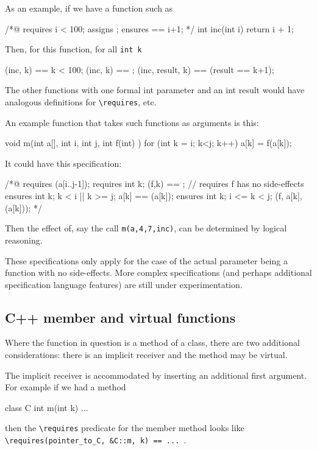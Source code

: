 As an example, if we have a function such as 
\begin{listing-nonumber}
/*@ requires i < 100;
       assigns \empty;
       ensures \result == i+1;
       */
int inc(int i) { return i + 1; }
\end{listing-nonumber}
Then, for this function, for all \lstinline|int k|
\begin{listing-nonumber}
\requires(inc, k) == k < 100;
\assigns(inc, k) == \empty;
\ensures(inc, result, k) == (result == k+1);
\end{listing-nonumber}
The other functions with one formal int parameter and an int result would have analogous definitions for \lstinline|\requires|, etc.

An example function that takes such functions as arguments is this:
\begin{listing-nonumber}
void m(int a[], int i, int j, int f(int) ) {
  for (int k = i; k<j; k++) a[k] = f(a[k]);
}
\end{listing-nonumber}

It could have this specification:
\begin{listing-nonumber}
/*@
  requires \valid(a[i..j-1]);
  requires \forall int k; \assigns(f,k) == \empty;  // requires f has no side-effects
  ensures \forall int k; k < i || k >= j; a[k] == \old(a[k]);
  ensures \forall int k; i <= k < j; \ensures(f, a[k], \old(a[k]));
*/
\end{listing-nonumber}
Then the effect of, say the call \lstinline|m(a,4,7,inc)|, can be determined by logical reasoning.

These specifications only apply for the case of the actual parameter being a function with no side-effects. More complex specifications (and perhaps additional specification language features) are still under experimentation.

\subsection{C++ member and virtual functions}

Where the function in question is a method of a class, there are two additional considerations: there is an implicit receiver and the method may be virtual.

The implicit receiver is accommodated by inserting an additional first argument. For example if we had a method
\begin{listing-nonumber}
class C {
  int m(int k) { ... }
}
\end{listing-nonumber}
then the  \lstinline|\requires| predicate for the member method looks like \lstinline|\requires(pointer_to_C, &C::m, k) == ... |.

